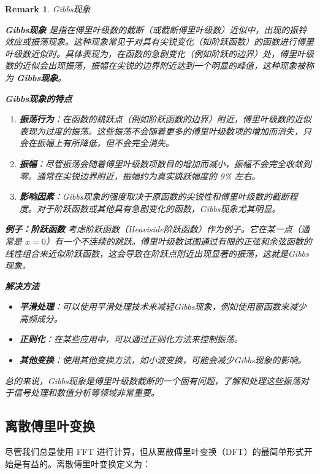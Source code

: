 \documentclass{ctexart}
\newtheorem*{remark}{Remark}
\begin{document}
\begin{remark}{Gibbs现象}


\textbf{Gibbs现象} 是指在傅里叶级数的截断（或截断傅里叶级数）近似中，出现的振铃效应或振荡现象。这种现象常见于对具有尖锐变化（如阶跃函数）的函数进行傅里叶级数近似时。具体表现为，在函数的急剧变化（例如阶跃的边界）处，傅里叶级数的近似会出现振荡，振幅在尖锐的边界附近达到一个明显的峰值，这种现象被称为 \textbf{Gibbs现象}。

\textbf{Gibbs现象的特点}
\begin{enumerate}
    \item \textbf{振荡行为}：在函数的跳跃点（例如阶跃函数的边界）附近，傅里叶级数的近似表现为过度的振荡。这些振荡不会随着更多的傅里叶级数项的增加而消失，只会在振幅上有所降低，但不会完全消失。
    \item \textbf{振幅}：尽管振荡会随着傅里叶级数项数目的增加而减小，振幅不会完全收敛到零。通常在尖锐边界附近，振幅约为真实跳跃幅度的 9\% 左右。
    \item \textbf{影响因素}：Gibbs现象的强度取决于原函数的尖锐性和傅里叶级数的截断程度。对于阶跃函数或其他具有急剧变化的函数，Gibbs现象尤其明显。
\end{enumerate}

\textbf{例子：阶跃函数}
考虑阶跃函数（Heaviside阶跃函数）作为例子。它在某一点（通常是 $x=0$）有一个不连续的跳跃。傅里叶级数试图通过有限的正弦和余弦函数的线性组合来近似阶跃函数，这会导致在阶跃点附近出现显著的振荡，这就是Gibbs现象。

\textbf{解决方法}
\begin{itemize}
    \item \textbf{平滑处理}：可以使用平滑处理技术来减轻Gibbs现象，例如使用窗函数来减少高频成分。
    \item \textbf{正则化}：在某些应用中，可以通过正则化方法来控制振荡。
    \item \textbf{其他变换}：使用其他变换方法，如小波变换，可能会减少Gibbs现象的影响。
\end{itemize}

总的来说，Gibbs现象是傅里叶级数截断的一个固有问题，了解和处理这些振荡对于信号处理和数值分析等领域非常重要。


\end{remark}


\subsection{离散傅里叶变换}

尽管我们总是使用 FFT 进行计算，但从离散傅里叶变换（DFT）的最简单形式开始是有益的。离散傅里叶变换定义为：
\end{document}
